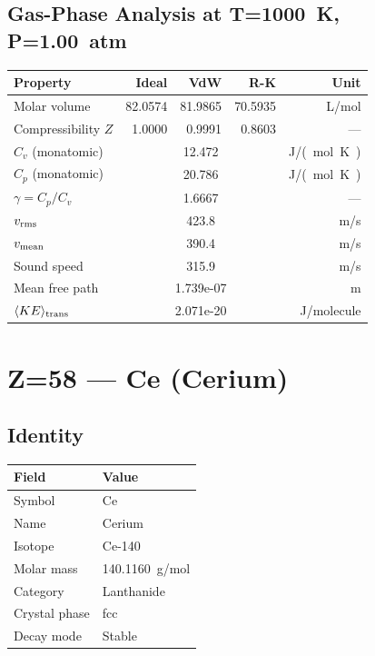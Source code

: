 \documentclass[11pt,a4paper]{article}
\begin{document}
\subsection{Gas-Phase Analysis at T=\SI{1000}{K}, P=\SI{1.00}{atm}}
\begin{tabular}{lrrrr}
  \toprule
  Property & Ideal & VdW & R-K & Unit \\
  \midrule
  Molar volume & 82.0574 & 81.9865 & 70.5935 & \si{L/mol} \\
  Compressibility $Z$ & 1.0000 & 0.9991 & 0.8603 & --- \\
  \midrule
  $C_v$ (monatomic) & \multicolumn{3}{c}{12.472} & \si{J/(mol.K)} \\
  $C_p$ (monatomic) & \multicolumn{3}{c}{20.786} & \si{J/(mol.K)} \\
  $\gamma = C_p/C_v$ & \multicolumn{3}{c}{1.6667} & --- \\
  $v_{\rm rms}$ & \multicolumn{3}{c}{423.8} & \si{m/s} \\
  $v_{\rm mean}$ & \multicolumn{3}{c}{390.4} & \si{m/s} \\
  Sound speed & \multicolumn{3}{c}{315.9} & \si{m/s} \\
  Mean free path & \multicolumn{3}{c}{1.739e-07} & \si{m} \\
  $\langle KE \rangle_{\rm trans}$ & \multicolumn{3}{c}{2.071e-20} & \si{J/molecule} \\
  \bottomrule
\end{tabular}

\newpage

\section{Z=58 --- Ce (Cerium)}
\label{sec:Z58}

\subsection{Identity}
\begin{tabular}{ll}
  \toprule
  Field & Value \\
  \midrule
  Symbol & Ce \\
  Name & Cerium \\
  Isotope & Ce-140 \\
  Molar mass & \SI{140.1160}{g/mol} \\
  Category & Lanthanide \\
  Crystal phase & fcc \\
  Decay mode & Stable \\
  \bottomrule
\end{tabular}
\end{document}
